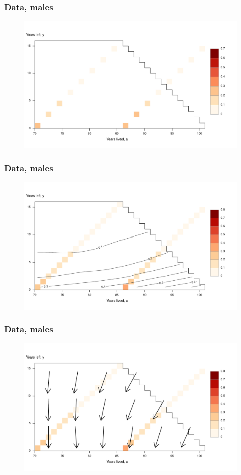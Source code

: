 \documentclass{beamer}
\begin{document}
\begin{frame}
\frametitle{Data, males}
\begin{figure}
\includegraphics[width=\linewidth]{Figures/SurfExampleFemalesADL3_1}
\end{figure}
\end{frame}
\begin{frame}
\frametitle{Data, males}
\begin{figure}
\includegraphics[width=\linewidth]{Figures/SurfExampleFemalesADL3_2}
\end{figure}
\end{frame}
\begin{frame}
\frametitle{Data, males}
\begin{figure}
\includegraphics[width=\linewidth]{Figures/SurfExampleFemalesADL3_3}
\end{figure}
\end{frame}
\end{document}
